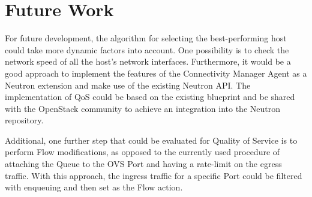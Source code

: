 \section{Future Work}

For future development, the algorithm for selecting the best-performing host could take more dynamic factors into account. One possibility is to check the network speed of all the host's network interfaces. Furthermore, it would be a good approach to implement the features of the Connectivity Manager Agent as a Neutron extension and make use of the existing Neutron API. The implementation of QoS could be based on the existing blueprint and be shared with the OpenStack community to achieve an integration into the Neutron repository.

Additional, one further step that could be evaluated for Quality of Service is to perform Flow modifications, as opposed to the currently used procedure of attaching the Queue to the OVS Port and having a rate-limit on the egress traffic. With this approach, the ingress traffic for a specific Port could be filtered with enqueuing and then set as the Flow action. 
